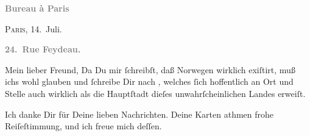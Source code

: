 \pstart
           \begin{otherlanguage}{french}\textcolor{gray}{\textbf{\textbf{Bureau à Paris}}}\end{otherlanguage}\hfill \textsc{Paris}, 14. Juli.\pend
           
\pstart
           \begin{otherlanguage}{french}\textcolor{gray}{\textbf{\textbf{24. Rue Feydeau.}}}\end{otherlanguage}\pend
           
\pstart\center{}Mein lieber Freund,\pend\vspace{0.5em}
\pstart
           Da Du mir ſchreibſt, daß Norwegen wirklich
               exiſtirt, muß ichs wohl glauben und ſchreibe Dir nach \label{K_L02781-1v}\label{K_L02781-1}, welches ſich hoffentlich an Ort und Stelle auch
               wirklich als die Hauptſtadt
               dieſes unwahrſcheinlichen Landes erweiſt.\pend
           
\pstart
           Ich danke Dir für Deine lieben Nachrichten. Deine Karten athmen frohe Reiſeſtimmung,
               und ich freue mich deſſen.\pend
           
